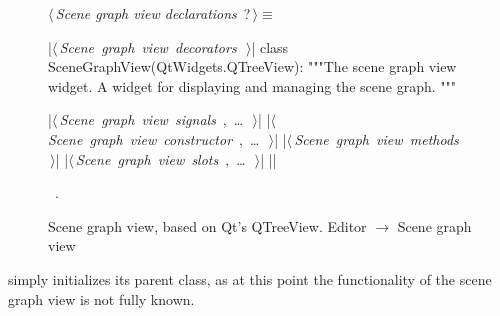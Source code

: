 \documentclass[%
    a4paper,    %
    justified,  %
    nobib,      %
    openany     %
]{tufte-book}
\begin{document}
\begin{figure}
\begin{flushleft} \small
\begin{minipage}{\linewidth}\label{scrap40}\raggedright\small
{} $\langle\,${\itshape Scene graph view declarations}\nobreak\ {\footnotesize {?}}$\,\rangle\equiv$
\vspace{-1ex}
\begin{pythoncode}
|\hbox{$\langle\,${\itshape Scene graph view decorators}\nobreak\ {\footnotesize {}}$\,\rangle$}|
class SceneGraphView(QtWidgets.QTreeView):
    """The scene graph view widget.
    A widget for displaying and managing the scene graph.
    """

    |\hbox{$\langle\,${\itshape Scene graph view signals}\nobreak\ {\footnotesize {}, \ldots\ }$\,\rangle$}|
    |\hbox{$\langle\,${\itshape Scene graph view constructor}\nobreak\ {\footnotesize {}, \ldots\ }$\,\rangle$}|
    |\hbox{$\langle\,${\itshape Scene graph view methods}\nobreak\ {\footnotesize {}}$\,\rangle$}|
    |\hbox{$\langle\,${\itshape Scene graph view slots}\nobreak\ {\footnotesize {}, \ldots\ }$\,\rangle$}|
|\NWsep|
\end{pythoncode}
\vspace{1.5ex}
\footnotesize
\begin{list}{}{\setlength{\itemsep}{-\parsep}\setlength{\itemindent}{-\leftmargin}}
\item \NWtxtMacroRefIn\ .

\item{}
\end{list}
\end{minipage}\vspace{4ex}
\end{flushleft}
\caption{Scene graph view, based on Qt's QTreeView.
  \newline{}\newline{}Editor $\rightarrow$ Scene graph view}
\label{editor:lst:scene-graph-view}
\end{figure}

 simply initializes its parent class, as at this
point the functionality of the scene graph view is not fully known.
\end{document}

